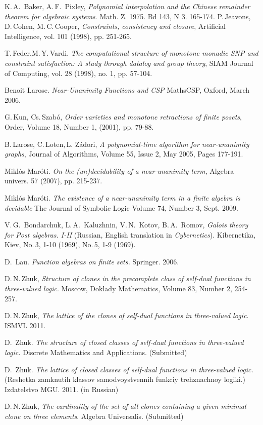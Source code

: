\documentclass{au}
\theoremstyle{plain}
\theoremstyle{definition}
\theoremstyle{remark}
\numberwithin{equation}{section}
\begin{document}
\setcounter{theorem}{\value{backup}}

\begin{thebibliography}{99}

K.\,A.~Baker, A.\,F.~Pixley, \emph{Polynomial interpolation and the Chinese remainder
theorem for algebraic systems}. Math. Z. 1975. Bd 143, N 3. 165-174.
P.\,Jeavons, D.\,Cohen, M.\,C.\,Cooper,
\emph{Constraints, consistency and closure}, Artificial Intelligence, vol. 101 (1998), pp. 251-265.

 T.\,Feder,M.\,Y.\,Vardi.
\emph{The computational structure of monotone monadic SNP and constraint
satisfaction: A study through datalog and group theory}, SIAM Journal of Computing, vol. 28 (1998),
no. 1, pp. 57-104.

Benoit Larose.
\emph{Near-Unanimity Functions and CSP}
MathsCSP, Oxford, March 2006.

G.\,Kun, Cs.\,Szab\'o,
\emph{Order varieties and monotone retractions of finite posets},
Order, Volume 18, Number 1, (2001), pp. 79-88.

B.\,Larose, C.\,Loten,\,L. Z\'adori,
\emph{A polynomial-time algorithm for near-unanimity graphs},
Journal of Algorithms, Volume 55, Issue 2, May 2005, Pages 177-191.

Mikl\'os Mar\'oti.
\emph{On the (un)decidability of a near-unanimity term},
Algebra univers. 57 (2007), pp. 215-237.

Mikl\'os Mar\'oti.
\emph{The existence of a near-unanimity term
in a finite algebra is decidable}
The Journal of Symbolic Logic
Volume 74, Number 3, Sept. 2009.

V.\,G.~Bondarchuk, L.\,A.~Kaluzhnin, V.\,N.~Kotov, B.\,A.~Romov,
\emph{Galois theory for Post algebras. I-II}
(Russian, English translation in \emph{Cybernetics}).
Kibernetika, Kiev, No.\,3, 1-10 (1969), No.\,5, 1-9 (1969).

D.~Lau. \emph{Function algebras on finite sets.} Springer. 2006.

D.\,N.\,Zhuk,
\emph{Structure of clones in the precomplete class of self-dual functions in three-valued logic}.
Moscow, Doklady Mathematics, Volume 83, Number 2, 254-257.

D.\,N.\,Zhuk,
\emph{The lattice of the clones of self-dual functions in three-valued logic}.
ISMVL 2011.

D.~Zhuk. \emph{The structure of closed classes of self-dual functions in three-valued logic.}
Discrete Mathematics and Applications. (Submitted)

D.~Zhuk. \emph{The lattice of closed classes of self-dual functions in three-valued logic.}
(Reshetka zamknutih klassov samodvoystvennih funkciy trehznachnoy logiki.)
Izdatelstvo MGU. 2011. (in Russian)

D.\,N.\,Zhuk,
\emph{The cardinality of the set of all clones containing a given minimal clone on three elements}.
Algebra Universalis. (Submitted)

\end{thebibliography}
\end{document}
